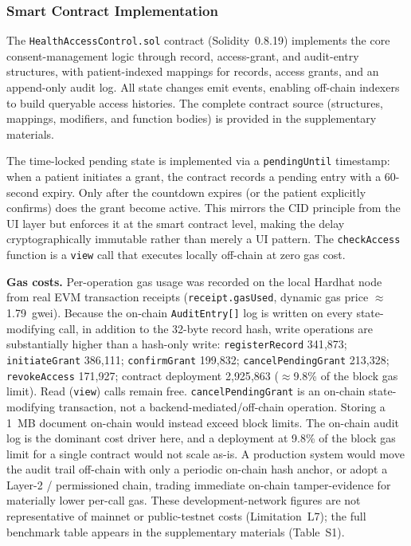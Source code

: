 \documentclass[journal,onecolumn]{IEEEtran}
\begin{document}
\subsubsection{Smart Contract Implementation}

The \texttt{HealthAccessControl.sol} contract (Solidity~0.8.19) implements the core consent-management logic through record, access-grant, and audit-entry structures, with patient-indexed mappings for records, access grants, and an append-only audit log. All state changes emit events, enabling off-chain indexers to build queryable access histories. The complete contract source (structures, mappings, modifiers, and function bodies) is provided in the supplementary materials.

The time-locked pending state is implemented via a \texttt{pendingUntil} timestamp: when a patient initiates a grant, the contract records a pending entry with a 60-second expiry. Only after the countdown expires (or the patient explicitly confirms) does the grant become active. This mirrors the CID principle from the UI layer but enforces it at the smart contract level, making the delay cryptographically immutable rather than merely a UI pattern. The \texttt{checkAccess} function is a \texttt{view} call that executes locally off-chain at zero gas cost.

\noindent\textbf{Gas costs.} Per-operation gas usage was recorded on the local Hardhat node from real EVM transaction receipts (\texttt{receipt.gasUsed}, dynamic gas price $\approx$1.79~gwei). Because the on-chain \texttt{AuditEntry[]} log is written on every state-modifying call, in addition to the 32-byte record hash, write operations are substantially higher than a hash-only write: \texttt{registerRecord} 341{,}873; \texttt{initiateGrant} 386{,}111; \texttt{confirmGrant} 199{,}832; \texttt{cancelPendingGrant} 213{,}328; \texttt{revokeAccess} 171{,}927; contract deployment 2{,}925{,}863 ($\approx$9.8\% of the block gas limit). Read (\texttt{view}) calls remain free. \texttt{cancelPendingGrant} is an on-chain state-modifying transaction, not a backend-mediated/off-chain operation. Storing a 1~MB document on-chain would instead exceed block limits. The on-chain audit log is the dominant cost driver here, and a deployment at 9.8\% of the block gas limit for a single contract would not scale as-is. A production system would move the audit trail off-chain with only a periodic on-chain hash anchor, or adopt a Layer-2 / permissioned chain, trading immediate on-chain tamper-evidence for materially lower per-call gas. These development-network figures are not representative of mainnet or public-testnet costs (Limitation~L7); the full benchmark table appears in the supplementary materials (Table~S1).
\end{document}
